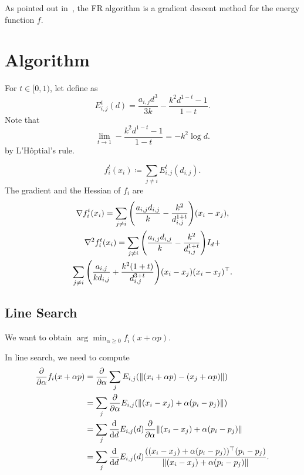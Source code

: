 \documentclass[journal]{IEEEtran}
\newcommand{\defeq}{\coloneqq}
\newcommand{\Lhopital}{L'H\^optial}
\begin{document}
As pointed out in~\cite{tunkelang1999numerical},
the FR algorithm is a gradient descent method for the energy function $f$.

\section{Algorithm} \label{sec:algorithm}

For $t \in [0,1)$, let define as
\begin{equation*}
  E_{i,j}^t(d) = \frac{a_{i,j} d^3}{3k} - \frac{k^2 d^{1-t} - 1}{1-t}.
\end{equation*}
Note that
\begin{equation*}
  \lim_{t \to 1} - \frac{k^2 d^{1-t} - 1}{1-t} = -k^2 \log{d}.
\end{equation*}
by \Lhopital's rule.

\begin{equation*}
  f_i^t(x_i) \defeq \sum_{j \neq i} E_{i,j}^t(d_{i,j}).
\end{equation*}
The gradient and the Hessian of $f_i$ are
\begin{gather*}
  \nabla f_i^t(x_i) = \sum_{j \neq i} \qty(\frac{a_{i,j}d_{i,j}}{k} - \frac{k^2}{d_{i,j}^{1+t}}) (x_i-x_j), \\
  \nabla^2 f_i^t(x_i) = \sum_{j \neq i} \qty(\frac{a_{i,j}d_{i,j}}{k} - \frac{k^2}{d_{i,j}^{1+t}}) I_d +      \\
  \sum_{j \neq i} \qty(\frac{a_{i,j}}{k d_{i,j}} + \frac{k^2(1+t)}{d_{i,j}^{3+t}}) (x_i - x_j)(x_i - x_j)^\top.
\end{gather*}

\subsection{Line Search}

We want to obtain
$
  \arg\min_{\alpha \geq 0} f_i(x + \alpha p).
$

In line search, we need to compute
\begin{align*}
  \pdv{\alpha} f_i(x+\alpha p)
   & = \pdv{\alpha} \sum_j E_{i,j}(\norm{(x_i + \alpha p) - (x_j + \alpha p)})                                                       \\
   & = \sum_j \pdv{\alpha} E_{i,j}(\norm{(x_i - x_j) + \alpha (p_i - p_j)})                                                          \\
   & = \sum_j \dv{d} E_{i,j}(d) \pdv{\alpha} \norm{(x_i - x_j) + \alpha (p_i - p_j)}                                                 \\
   & = \sum_j \dv{d} E_{i,j}(d) \frac{((x_i - x_j) + \alpha (p_i - p_j))^\top (p_i - p_j)}{\norm{(x_i - x_j) + \alpha (p_i - p_j)}}.
\end{align*}
\end{document}
